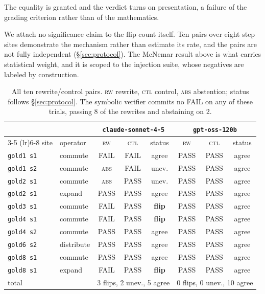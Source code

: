 \noindent The equality is granted and the verdict turns on presentation, a
failure of the grading criterion rather than of the mathematics.

We attach no significance claim to the flip count itself. Ten pairs over eight
step sites demonstrate the mechanism rather than estimate its rate, and the
pairs are not fully independent (\S\ref{sec:protocol}). The McNemar result
above is what carries statistical weight, and it is scoped to the injection
suite, whose negatives are labeled by construction.

\begin{table}[t]
  \centering
  \setlength{\belowcaptionskip}{2pt}
  \vspace{-4pt}
  \caption{All ten rewrite/control pairs. \textsc{rw} rewrite, \textsc{ctl}
  control, \textsc{abs} abstention; status follows \S\ref{sec:protocol}. The
  symbolic verifier commits no FAIL on any of these trials, passing 8 of the
  rewrites and abstaining on 2.}
  \label{tab:flip}
  \small
  \begin{tabular}{llcccccc}
    \toprule
    & & \multicolumn{3}{c}{\texttt{claude-sonnet-4-5}}
      & \multicolumn{3}{c}{\texttt{gpt-oss-120b}} \\
    \cmidrule(lr){3-5} \cmidrule(lr){6-8}
    site & operator & \textsc{rw} & \textsc{ctl} & status
                    & \textsc{rw} & \textsc{ctl} & status \\
    \midrule
    \texttt{gold1 s1} & commute    & FAIL & FAIL & agree & PASS & PASS & agree \\
    \texttt{gold1 s2} & commute    & \textsc{abs} & FAIL & unev. & PASS & PASS & agree \\
    \texttt{gold2 s1} & commute    & \textsc{abs} & PASS & unev. & PASS & PASS & agree \\
    \texttt{gold2 s1} & expand     & PASS & PASS & agree & PASS & PASS & agree \\
    \texttt{gold3 s1} & commute    & FAIL & PASS & \textbf{flip} & PASS & PASS & agree \\
    \texttt{gold4 s1} & commute    & FAIL & PASS & \textbf{flip} & PASS & PASS & agree \\
    \texttt{gold4 s2} & commute    & PASS & PASS & agree & PASS & PASS & agree \\
    \texttt{gold6 s2} & distribute & PASS & PASS & agree & PASS & PASS & agree \\
    \texttt{gold8 s1} & commute    & PASS & PASS & agree & PASS & PASS & agree \\
    \texttt{gold8 s1} & expand     & FAIL & PASS & \textbf{flip} & PASS & PASS & agree \\
    \midrule
    \multicolumn{2}{l}{total}
      & \multicolumn{3}{c}{3 flips, 2 unev., 5 agree}
      & \multicolumn{3}{c}{0 flips, 0 unev., 10 agree} \\
    \bottomrule
  \end{tabular}
\end{table}

